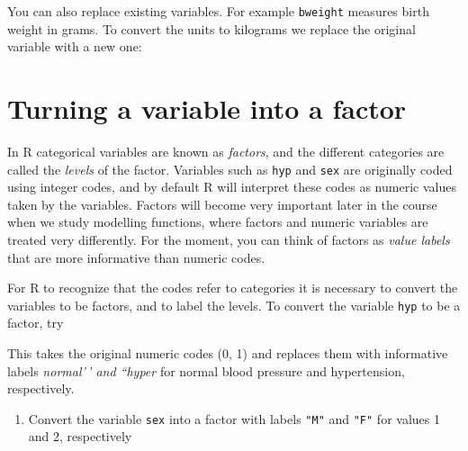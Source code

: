 \documentclass[
]{book}
\newenvironment{Shaded}{\begin{snugshade}}{\end{snugshade}}
\newcommand{\AttributeTok}[1]{\textcolor[rgb]{0.13,0.29,0.53}{#1}}
\newcommand{\DecValTok}[1]{\textcolor[rgb]{0.00,0.00,0.81}{#1}}
\newcommand{\FunctionTok}[1]{\textcolor[rgb]{0.13,0.29,0.53}{\textbf{#1}}}
\newcommand{\NormalTok}[1]{#1}
\newcommand{\OtherTok}[1]{\textcolor[rgb]{0.56,0.35,0.01}{#1}}
\newcommand{\SpecialCharTok}[1]{\textcolor[rgb]{0.81,0.36,0.00}{\textbf{#1}}}
\newcommand{\StringTok}[1]{\textcolor[rgb]{0.31,0.60,0.02}{#1}}
\providecommand{\tightlist}{%
  \setlength{\itemsep}{0pt}\setlength{\parskip}{0pt}}
\begin{document}
You can also replace existing variables. For example \texttt{bweight} measures
birth weight in grams. To convert the units to kilograms we replace the
original variable with a new one:

\begin{Shaded}
\end{Shaded}

\section{Turning a variable into a factor}\label{turning-a-variable-into-a-factor}

In R categorical variables are known as \emph{factors}, and the
different categories are called the \emph{levels} of the factor.
Variables such as \texttt{hyp} and \texttt{sex} are originally coded using
integer codes, and by default R will interpret these codes as numeric
values taken by the variables. Factors will become very important
later in the course when we study modelling functions, where
factors and numeric variables are treated very differently. For the moment,
you can think of factors as \emph{value labels} that are more informative
than numeric codes.

For R to recognize that the codes refer to categories it is necessary
to convert the variables to be factors, and to label the levels. To
convert the variable \texttt{hyp} to be a factor, try

\begin{Shaded}
\end{Shaded}

This takes the original numeric codes (0, 1) and replaces them with
informative labels \emph{normal'\,' and ``hyper} for normal blood pressure
and hypertension, respectively.

\begin{enumerate}
\def\labelenumi{\arabic{enumi}.}
\tightlist
\item
  Convert the variable \texttt{sex} into a factor
  with labels \texttt{"M"} and \texttt{"F"} for values 1 and 2, respectively
\end{enumerate}
\end{document}
